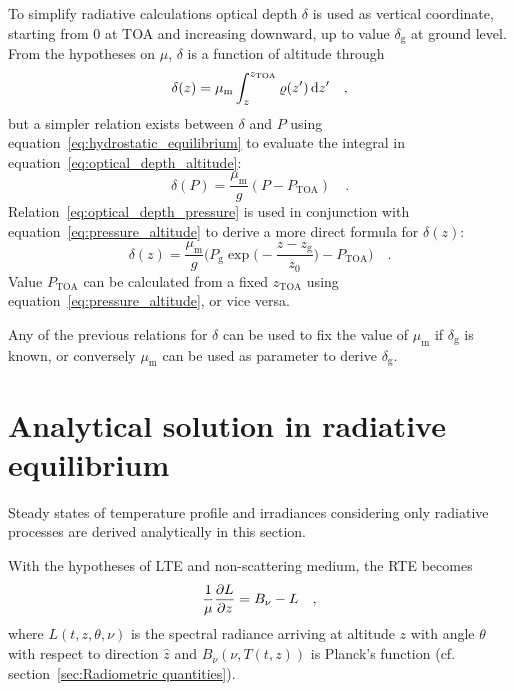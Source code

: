 \documentclass[a4paper,10pt,twocolumn,\classoptions]{article}
\newcommand{\zTOA}{z_\text{TOA}}
\newcommand{\PTOA}{P_\text{TOA}}
\begin{document}
To simplify radiative calculations optical depth $\delta$ is used as vertical coordinate, starting from \num{0} at TOA and increasing downward, up to value $\delta_\text{g}$ at ground level. From the hypotheses on $\mu$, $\delta$ is a function of altitude through
\begin{equation}
  \label{eq:optical_depth_altitude}
  \delta(z) = \mu_\text{m} \int_{z}^{\zTOA} \varrho(z') \odif{z'}
  \quad ,
\end{equation}
but a simpler relation exists between $\delta$ and $P$ using equation~\eqref{eq:hydrostatic_equilibrium} to evaluate the integral in equation~\eqref{eq:optical_depth_altitude}:
\begin{equation}
  \label{eq:optical_depth_pressure}
  \delta(P) = \frac{\mu_\text{m}}{g} (P - \PTOA)
  \quad .
\end{equation}
Relation~\eqref{eq:optical_depth_pressure} is used in conjunction with equation~\eqref{eq:pressure_altitude} to derive a more direct formula for $\delta(z)$:
\begin{equation}
  \label{eq:optical_depth_altitude_2}
  \delta(z) = \frac{\mu_\text{m}}{g} \bigg( P_\text{g} \exp{\bigg( - \frac{z - z_\text{g}}{z_0} \bigg)} - \PTOA \bigg)
  \quad .
\end{equation}
Value $\PTOA$ can be calculated from a fixed $\zTOA$ using equation~\eqref{eq:pressure_altitude}, or vice versa.

Any of the previous relations for $\delta$ can be used to fix the value of $\mu_\text{m}$ if $\delta_\text{g}$ is known, or conversely $\mu_\text{m}$ can be used as parameter to derive $\delta_\text{g}$.



\section{Analytical solution in radiative equilibrium}
\label{sec:Analytical solution in radiative equilibrium}
Steady states of temperature profile and irradiances considering only radiative processes are derived analytically in this section.

With the hypotheses of LTE and non-scattering medium, the RTE becomes
\begin{equation}
  \label{eq:RTE_analytical}
  \frac{1}{\mu} \pdv{L}{z} = B_\nu - L
  \quad ,
\end{equation}
where $L(t, z, \theta, \nu)$ is the spectral radiance arriving at altitude $z$ with angle $\theta$ with respect to direction $\hat{z}$ and $B_\nu(\nu, T(t,z))$ is Planck's function (cf. section~\ref{sec:Radiometric quantities}).
\end{document}

